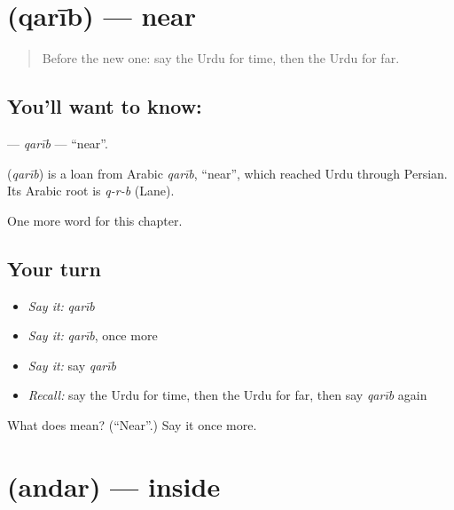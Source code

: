 \section[\texorpdfstring{\ur{قریب} (qarīb)}{قریب (qarīb)}]{ (qarīb) — near}

\label{lesson:UR-C78-qarib}



\begin{quote}
Before the new one: say the Urdu for time, then the Urdu for far.
\end{quote}

\subsection*{You'll want to know: }
\textbf{} — \emph{qarīb} — \textquotedblleft{}near\textquotedblright{}.

\begin{cousinweb}
\textbf{} (\emph{qarīb}) is a loan from Arabic \emph{qarīb}, \textquotedblleft{}near\textquotedblright{}, which reached Urdu through Persian. Its Arabic root is \emph{q-r-b} (Lane).
\end{cousinweb}

\begin{grammarlens}[title={What you've built}]
One more word for this chapter.
\end{grammarlens}

\subsection*{Your turn}
\begin{itemize}
\raggedright
  \item \emph{Say it:} \emph{qarīb}
  \item \emph{Say it:} \emph{qarīb}, once more
  \item \emph{Say it:} say \emph{qarīb}
  \item \emph{Recall:} say the Urdu for time, then the Urdu for far, then say \emph{qarīb} again
\end{itemize}

\begin{tcolorbox}[breakable,colback=teal!4,colframe=teal!35!black,title={Before you move on}]
What does  mean? (\textquotedblleft{}Near\textquotedblright{}.) Say it once more.
\end{tcolorbox}
\section[\texorpdfstring{\ur{اندر} (andar)}{اندر (andar)}]{ (andar) — inside}

